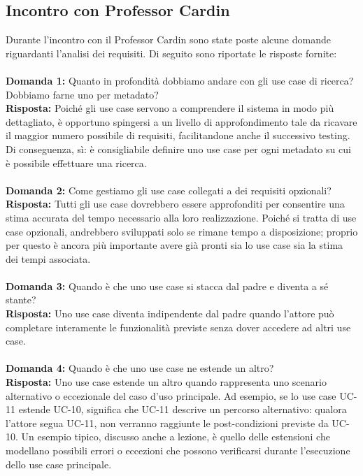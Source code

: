 \documentclass[a4paper,12pt]{article}
\begin{document}
\subsection{Incontro con Professor Cardin}
Durante l'incontro con il Professor Cardin sono state poste alcune domande riguardanti l'analisi dei requisiti. Di seguito sono riportate le risposte fornite: \\\\
\textbf{Domanda 1:} Quanto in profondità dobbiamo andare con gli use case di ricerca? Dobbiamo farne uno per metadato? \\
\textbf{Risposta:} Poiché gli use case servono a comprendere il sistema in modo più dettagliato, è opportuno spingersi a un livello di approfondimento tale da 
ricavare il maggior numero possibile di requisiti, facilitandone anche il successivo testing. Di conseguenza, sì: è consigliabile definire uno use case per ogni 
metadato su cui è possibile effettuare una ricerca. \\\\
\textbf{Domanda 2:} Come gestiamo gli use case collegati a dei requisiti opzionali? \\
\textbf{Risposta:} Tutti gli use case dovrebbero essere approfonditi per consentire una stima accurata del tempo necessario alla loro realizzazione. Poiché si tratta 
di use case opzionali, andrebbero sviluppati solo se rimane tempo a disposizione; proprio per questo è ancora più importante avere già pronti sia lo use case sia la 
stima dei tempi associata.\\\\
\textbf{Domanda 3:} Quando è che uno use case si stacca dal padre e diventa a sé stante? \\
\textbf{Risposta:} Uno use case diventa indipendente dal padre quando l'attore può completare interamente le funzionalità previste senza dover accedere ad altri use case. \\\\
\textbf{Domanda 4:} Quando è che uno use case ne estende un altro? \\
\textbf{Risposta:} Uno use case estende un altro quando rappresenta uno scenario alternativo o eccezionale del caso d'uso principale. Ad esempio, se lo use case UC-11 estende UC-10,
 significa che UC-11 descrive un percorso alternativo: qualora l'attore segua UC-11, non verranno raggiunte le post-condizioni previste da UC-10. Un esempio tipico, discusso 
 anche a lezione, è quello delle estensioni che modellano possibili errori o eccezioni che possono verificarsi durante l'esecuzione dello use case principale.
\end{document}
